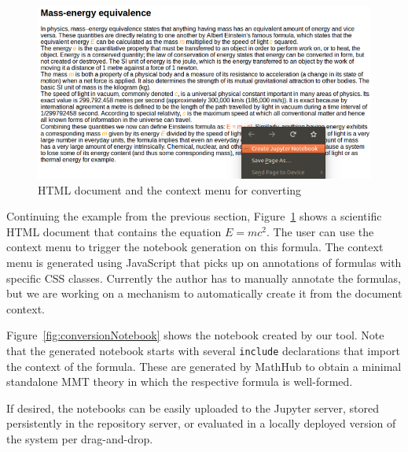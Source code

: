 \begin{figure}[ht]\centering
  \includegraphics[width=15cm]{../D4.11/conversionHTML}
  \caption{HTML document and the context menu for converting}\label{fig:conversionHTML}
\end{figure}

Continuing the example from the previous section, Figure~\ref{fig:conversionHTML} shows a scientific HTML document that contains the equation $E=mc^2$.
The user can use the context menu to trigger the notebook generation on this formula.
The context menu is generated using JavaScript that picks up on annotations of formulas with specific CSS classes.
Currently the author has to manually annotate the formulas, but we are working on a mechanism to automatically create it from the document context.

Figure~\ref{fig:conversionNotebook} shows the notebook created by our tool.
Note that the generated notebook starts with several \texttt{include} declarations that import the context of the formula.
These are generated by MathHub to obtain a minimal standalone MMT theory in which the respective formula is well-formed. 

If desired, the notebooks can be easily uploaded to the Jupyter server, stored persistently in the repository server, or evaluated in a locally deployed version of the system per drag-and-drop.



